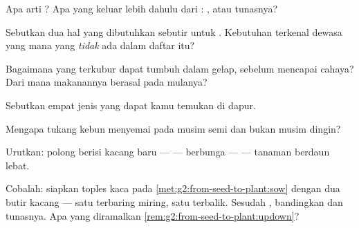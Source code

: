 \begin{exercise}[$\star$]\label{exo:g2:from-seed-to-plant:2}
Apa arti \emph{}? Apa yang keluar lebih dahulu dari
: , atau tunasnya?
\end{exercise}

\begin{exercise}[$\star$]\label{exo:g2:from-seed-to-plant:3}
Sebutkan dua hal yang dibutuhkan sebutir  untuk .
Kebutuhan terkenal  dewasa yang mana yang \emph{tidak} ada
dalam daftar itu?
\end{exercise}

\begin{exercise}[$\star$]\label{exo:g2:from-seed-to-plant:4}
Bagaimana  yang terkubur dapat tumbuh dalam gelap, sebelum
mencapai cahaya? Dari mana makanannya berasal pada mulanya?
\end{exercise}

\begin{exercise}[$\star$]\label{exo:g2:from-seed-to-plant:5}
Sebutkan empat jenis  yang dapat kamu temukan di dapur.
\end{exercise}

\begin{exercise}[$\star$]\label{exo:g2:from-seed-to-plant:6}
Mengapa tukang kebun menyemai pada musim semi dan bukan musim dingin?
\end{exercise}

\begin{exercise}[$\star$]\label{exo:g2:from-seed-to-plant:7}
Urutkan: polong berisi kacang baru ---  ---  berbunga ---
 --- tanaman berdaun lebat.
\end{exercise}

\begin{exercise}[$\star$]\label{exo:g2:from-seed-to-plant:8}
Cobalah: siapkan toples kaca pada \cref{met:g2:from-seed-to-plant:sow}
dengan dua butir kacang --- satu terbaring miring, satu terbalik.
Sesudah , bandingkan  dan tunasnya. Apa yang diramalkan
\cref{rem:g2:from-seed-to-plant:updown}?
\end{exercise}

